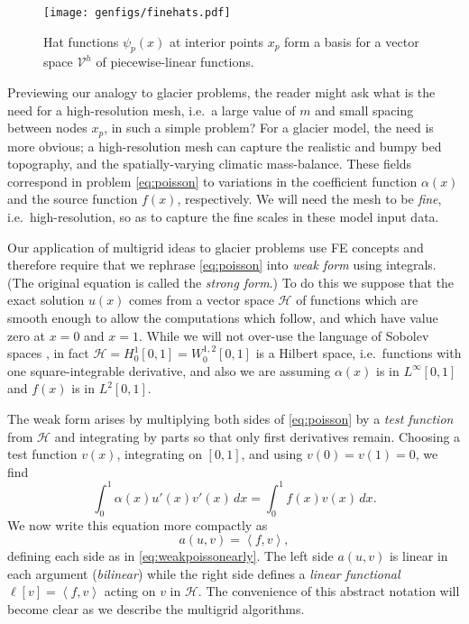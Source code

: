 \documentclass[letterpaper,final,12pt,reqno]{amsart}
\theoremstyle{claim}
\newcommand{\ip}[2]{\left<#1,#2\right>}
\numberwithin{equation}{section}
\numberwithin{figure}{section}
\numberwithin{table}{section}
\numberwithin{theorem}{section}
\begin{document}
\begin{figure}
\texttt{[image: genfigs/finehats.pdf]}
\caption{Hat functions $\psi_p(x)$ at interior points $x_p$ form a basis for a vector space $\mathcal{V}^h$ of piecewise-linear functions.}
\label{fig:finehats}
\end{figure}

Previewing our analogy to glacier problems, the reader might ask what is the need for a high-resolution mesh, i.e.~a large value of $m$ and small spacing between nodes $x_p$, in such a simple problem?  For a glacier model, the need is more obvious; a high-resolution mesh can capture the realistic and bumpy bed topography, and the spatially-varying climatic mass-balance.  These fields correspond in problem \eqref{eq:poisson} to variations in the coefficient function $\alpha(x)$ and the source function $f(x)$, respectively.  We will need the mesh to be \emph{fine}, i.e.~high-resolution, so as to capture the fine scales in these model input data.

Our application of multigrid ideas to glacier problems use FE concepts and therefore require that we rephrase \eqref{eq:poisson} into \emph{weak form} using integrals.  (The original equation is called the \emph{strong form}.)  To do this we suppose that the exact solution $u(x)$ comes from a vector space $\mathcal{H}$ of functions which are smooth enough to allow the computations which follow, and which have value zero at $x=0$ and $x=1$.  While we will not over-use the language of Sobolev spaces \cite[for example]{Evans2010}, in fact $\mathcal{H}=H_0^1[0,1]=W_0^{1,2}[0,1]$ is a Hilbert space, i.e.~functions with one square-integrable derivative, and also we are assuming $\alpha(x)$ is in $L^\infty[0,1]$ and $f(x)$ is in $L^2[0,1]$.

The weak form arises by multiplying both sides of \eqref{eq:poisson} by a \emph{test function} from $\mathcal{H}$ and integrating by parts so that only first derivatives remain.  Choosing a test function $v(x)$, integrating on $[0,1]$, and using $v(0)=v(1)=0$, we find
\begin{equation}
\int_0^1 \alpha(x) u'(x) v'(x)\,dx = \int_0^1 f(x) v(x)\, dx.  \label{eq:weakpoissonearly}
\end{equation}
We now write this equation more compactly as
\begin{equation}
  a(u,v) = \ip{f}{v}, \label{eq:weakpoisson}
\end{equation}
defining each side as in \eqref{eq:weakpoissonearly}.  The left side $a(u,v)$ is linear in each argument (\emph{bilinear}) while the right side defines a \emph{linear functional} $\ell[v] = \ip{f}{v}$ acting on $v$ in $\mathcal{H}$.  The convenience of this abstract notation will become clear as we describe the multigrid algorithms.
\end{document}

